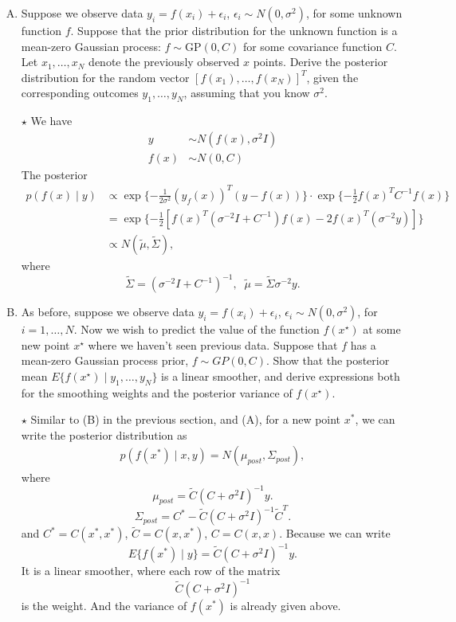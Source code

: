 \documentclass[11pt]{article}
\newcommand{\jie}{$\star$ }
\begin{document}
\begin{enumerate}[(A)]

\item Suppose we observe data $y_i = f(x_i) + \epsilon_i$, $\epsilon_i \sim N(0, \sigma^2)$, for some unknown function $f$. Suppose that the prior distribution for the unknown function is a mean-zero Gaussian process: $f \sim \mbox{GP}(0, C)$ for some covariance function $C$.  Let $x_1, \ldots, x_N$ denote the previously observed $x$ points.  Derive the posterior distribution for the random vector $[f(x_1), \ldots, f(x_N)]^T$, given the corresponding outcomes $y_1, \ldots, y_N$, assuming that you know $\sigma^2$.

\bigskip \jie
We have 
\begin{align*}
    y &\sim N(f(x), \sigma^2 I) \\
    f(x) &\sim N(0,C)
\end{align*}
The posterior 
\begin{align*}
    p(f(x) \mid y) &\propto \exp\{-\frac{1}{2\sigma^2} (y _ f(x))^T(y - f(x)) \} \cdot \exp \{ -\frac{1}2 f(x)^T C^{-1} f(x) \} \\
    &= \exp \{ -\frac{1}2 [f(x)^T (\sigma^{-2} I + C^{-1}) f(x) - 2 f(x)^T (\sigma^{-2}y)] \} \\
    &\propto N(\tilde{\mu}, \tilde{\Sigma}),
\end{align*}
where
$$\tilde{\Sigma} = (\sigma^{-2}I + C^{-1})^{-1}, \;\; \tilde{\mu} = \tilde{\Sigma} \sigma^{-2}y.$$

\item As before, suppose we observe data $y_i = f(x_i) + \epsilon_i$, $\epsilon_i \sim N(0, \sigma^2)$, for $i=1, \ldots, N$.  Now we wish to predict the value of the function $f(x^{\star})$ at some new point $x^{\star}$ where we haven't seen previous data.  Suppose that $f$ has a mean-zero Gaussian process prior, $f \sim GP(0, C)$.  Show that the posterior mean $E\{ f(x^{\star}) \mid y_1, \ldots, y_N \}$ is a linear smoother, and derive expressions both for the smoothing weights and the posterior variance of $f(x^{\star})$.

\bigskip \jie
Similar to (B) in the previous section, and (A), for a new point $x^*$, we can write the posterior distribution as
\begin{align*}
    p(f(x^*) \mid x,y) = N(\mu_{post}, \Sigma_{post}),
\end{align*}
where
$$\mu_{post} = \tilde{C}(C + \sigma^2 I)^{-1}y.$$
$$\Sigma_{post} = C^* - \tilde{C}(C + \sigma^2 I)^{-1}\tilde{C}^T.$$
and $C^* = C(x^*, x^*)$, $\tilde{C} = C(x, x^*)$, $C = C(x, x)$.
Because we can write 
$$E\{f(x^*) \mid y\} = \tilde{C}(C + \sigma^2 I)^{-1}y.$$
It is a linear smoother, where each row of the matrix 
$$ \tilde{C}(C + \sigma^2 I)^{-1}$$
is the weight. And the variance of $f(x^*)$ is already given above.



\end{enumerate}
\end{document}
